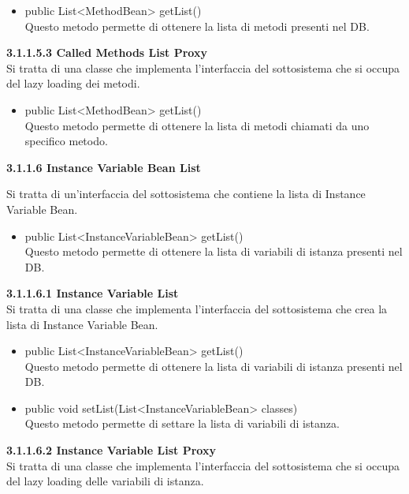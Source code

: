 \documentclass[11pt]{article}
\begin{document}
\begin{description}
			\begin{itemize}
				\item public List<MethodBean> getList() \\
				Questo metodo permette di ottenere la lista di metodi presenti nel DB.
			\end{itemize}
			
			\item \textbf{ 3.1.1.5.3  Called Methods List Proxy} \\
			Si tratta di una classe che implementa l'interfaccia del sottosistema che si occupa del lazy loading dei metodi.
			
			\begin{itemize}
				\item public List<MethodBean> getList() \\
				Questo metodo permette di ottenere la lista di metodi chiamati da uno specifico metodo.
			\end{itemize}
		
				\item \textbf{3.1.1.6  Instance Variable Bean List} 
				\item Si tratta di un'interfaccia del sottosistema che contiene la lista di Instance Variable Bean.
				
				\begin{itemize}
					\item public List<InstanceVariableBean> getList()\\
					Questo metodo permette di ottenere la lista di variabili di istanza presenti nel DB.
				\end{itemize}
				\item \textbf{ 3.1.1.6.1  Instance Variable List} \\
				Si tratta di una classe che implementa l'interfaccia del sottosistema che crea la lista di Instance Variable Bean.
				\begin{itemize}
					\item public List<InstanceVariableBean> getList() \\
					Questo metodo permette di ottenere la lista di variabili di istanza presenti nel DB.
					\item public void setList(List<InstanceVariableBean> classes)\\
					Questo metodo permette di settare la lista di variabili di istanza.
				\end{itemize}
				\item \textbf{ 3.1.1.6.2  Instance Variable List Proxy} \\
				Si tratta di una classe che implementa l'interfaccia del sottosistema che si occupa del lazy loading delle variabili di istanza.
				

\end{description}
\end{document}
